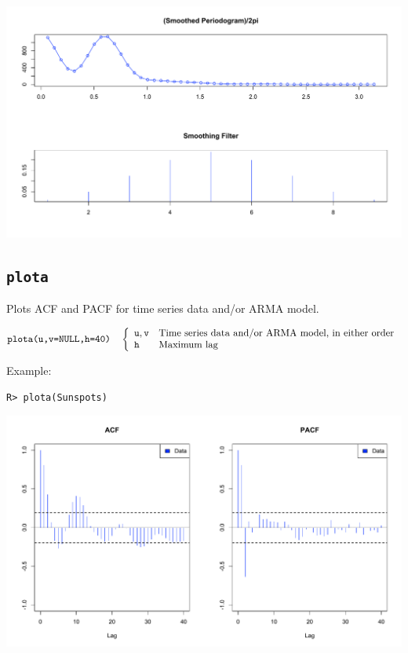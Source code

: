 \documentclass[12pt]{article}
\begin{document}
\begin{center}
\includegraphics[scale=0.3]{Rplot-52.pdf}
\end{center}

\newpage

\subsection{\tt plota}
Plots ACF and PACF for time series data and/or ARMA model.

\bigskip
$
\hbox{\tt plota(u,v=NULL,h=40)}\quad\left\{\begin{array}{ll}
{\tt u, v} & \hbox{Time series data and/or ARMA model, in either order}\\
{\tt h} & \hbox{Maximum lag}
\end{array}\right.
$

\bigskip
\noindent
Example:

\begin{verbatim}
R> plota(Sunspots)
\end{verbatim}

\begin{center}
\includegraphics[scale=0.3]{Rplot-21.pdf}
\end{center}
\end{document}
